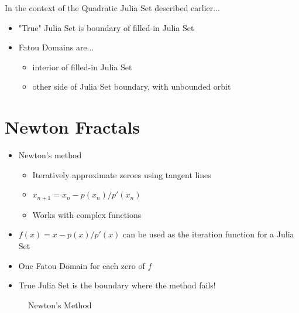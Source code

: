 \documentclass{article}
\begin{document}
In the context of the Quadratic Julia Set described earlier...
\begin{itemize}
    \item "True" Julia Set is boundary of filled-in Julia Set
    \item Fatou Domains are...
        \begin{itemize}
            \item interior of filled-in Julia Set
            \item other side of Julia Set boundary, with unbounded orbit
        \end{itemize}
\end{itemize}


\section{Newton Fractals}

\begin{itemize}
    \item Newton's method
    \begin{itemize}
        \item Iteratively approximate zeroes using tangent lines
        \item $x_{n+1} = x_n - p(x_n)/p'(x_n)$
        \item Works with complex functions
    \end{itemize}
    \item $f(x) = x - p(x)/p'(x)$ can be used as the iteration function for a Julia Set
    \item One Fatou Domain for each zero of $f$
    \item True Julia Set is the boundary where the method fails!
\end{itemize}


\begin{figure}[!htbp]
    \centering
    \caption{Newton's Method} %
\end{figure}%


%
\end{document}
